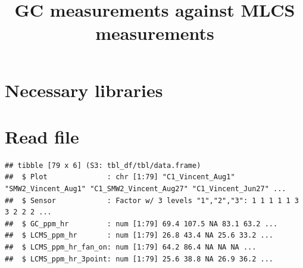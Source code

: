 \documentclass[
]{article}
\title{GC measurements against MLCS measurements}
\author{}
\date{\vspace{-2.5em}}
\newenvironment{Shaded}{\begin{snugshade}}{\end{snugshade}}
\newcommand{\AttributeTok}[1]{\textcolor[rgb]{0.13,0.29,0.53}{#1}}
\newcommand{\DecValTok}[1]{\textcolor[rgb]{0.00,0.00,0.81}{#1}}
\newcommand{\FunctionTok}[1]{\textcolor[rgb]{0.13,0.29,0.53}{\textbf{#1}}}
\newcommand{\NormalTok}[1]{#1}
\newcommand{\OtherTok}[1]{\textcolor[rgb]{0.56,0.35,0.01}{#1}}
\newcommand{\SpecialCharTok}[1]{\textcolor[rgb]{0.81,0.36,0.00}{\textbf{#1}}}
\newcommand{\StringTok}[1]{\textcolor[rgb]{0.31,0.60,0.02}{#1}}
\begin{document}
\maketitle

\section{Necessary libraries}\label{necessary-libraries}

\section{Read file}\label{read-file}

\begin{Shaded}
\end{Shaded}

\begin{verbatim}
## tibble [79 x 6] (S3: tbl_df/tbl/data.frame)
##  $ Plot              : chr [1:79] "C1_Vincent_Aug1" "SMW2_Vincent_Aug1" "C1_SMW2_Vincent_Aug27" "C1_Vincent_Jun27" ...
##  $ Sensor            : Factor w/ 3 levels "1","2","3": 1 1 1 1 1 3 3 2 2 2 ...
##  $ GC_ppm_hr         : num [1:79] 69.4 107.5 NA 83.1 63.2 ...
##  $ LCMS_ppm_hr       : num [1:79] 26.8 43.4 NA 25.6 33.2 ...
##  $ LCMS_ppm_hr_fan_on: num [1:79] 64.2 86.4 NA NA NA ...
##  $ LCMS_ppm_hr_3point: num [1:79] 25.6 38.8 NA 26.9 36.2 ...
\end{verbatim}
\end{document}
